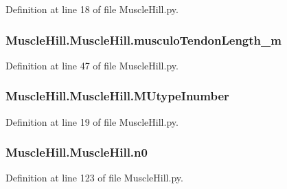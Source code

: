 Definition at line 18 of file Muscle\+Hill.\+py.

\subsubsection[{\texorpdfstring{musculo\+Tendon\+Length\+\_\+m}{musculoTendonLength_m}}]{\setlength{\rightskip}{0pt plus 5cm}Muscle\+Hill.\+Muscle\+Hill.\+musculo\+Tendon\+Length\+\_\+m}\hypertarget{class_muscle_hill_1_1_muscle_hill_a6b615b78ce60501d8231974115ad7d9c}{}\label{class_muscle_hill_1_1_muscle_hill_a6b615b78ce60501d8231974115ad7d9c}


Definition at line 47 of file Muscle\+Hill.\+py.

\subsubsection[{\texorpdfstring{M\+Utype\+Inumber}{MUtypeInumber}}]{\setlength{\rightskip}{0pt plus 5cm}Muscle\+Hill.\+Muscle\+Hill.\+M\+Utype\+Inumber}\hypertarget{class_muscle_hill_1_1_muscle_hill_ae7e7a4fe4112e6a88b04cfd8705e1374}{}\label{class_muscle_hill_1_1_muscle_hill_ae7e7a4fe4112e6a88b04cfd8705e1374}


Definition at line 19 of file Muscle\+Hill.\+py.

\subsubsection[{\texorpdfstring{n0}{n0}}]{\setlength{\rightskip}{0pt plus 5cm}Muscle\+Hill.\+Muscle\+Hill.\+n0}\hypertarget{class_muscle_hill_1_1_muscle_hill_a5498b7d71259c2a9202f48d5f528641b}{}\label{class_muscle_hill_1_1_muscle_hill_a5498b7d71259c2a9202f48d5f528641b}


Definition at line 123 of file Muscle\+Hill.\+py.

